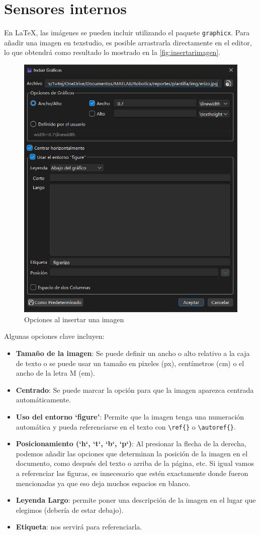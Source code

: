 \section{Sensores internos}
En \LaTeX, las imágenes se pueden incluir utilizando el paquete \texttt{graphicx}. 
Para añadir una imagen en texstudio, es posible arrastrarla directamente en el editor, lo que obtendrá como resultado lo mostrado en la \autoref{fig:insertarimagen}.

\begin{figure}[h]
	\centering
	\includegraphics[width=0.7\linewidth]{img/insertarImagen}
	\caption{Opciones al insertar una imagen}
	\label{fig:insertarimagen}
\end{figure}

Algunas opciones clave incluyen:

\begin{itemize}
	\item \textbf{Tamaño de la imagen}: Se puede definir un ancho o alto relativo a la caja de texto o se puede usar un tamaño en pixeles (px), centímetros (cm) o el ancho de la letra M (em).
	\item \textbf{Centrado}: Se puede marcar la opción para que la imagen aparezca centrada automáticamente.
	\item \textbf{Uso del entorno `figure'}: Permite que la imagen tenga una numeración automática y pueda referenciarse en el texto con \texttt{\textbackslash ref\{\}} o \texttt{\textbackslash autoref\{\}}.
	\item \textbf{Posicionamiento (`h`, `t`, `b`, `p`)}: Al presionar la flecha de la derecha, podemos añadir las opciones que determinan la posición de la imagen en el documento, como después del texto o arriba de la página, etc. Si igual vamos a referenciar las figuras, es innecesario que estén exactamente donde fueron mencionadas ya que eso deja muchos espacios en blanco.
	\item \textbf{Leyenda Largo}: permite poner una descripción de la imagen en el lugar que elegimos (debería de estar debajo).
	\item \textbf{Etiqueta}: nos servirá para referenciarla. 
\end{itemize}

